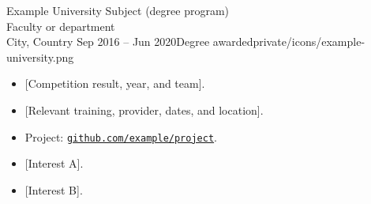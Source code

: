\begin{cvcontinued}{Example University}
  {Subject (degree program)\\Faculty or department\\City, Country}
  {Sep 2016 -- Jun 2020}{Degree awarded}{private/icons/example-university.png}
\end{cvcontinued}

\begin{itemize}
  \item {[Competition result, year, and team]}.
  \item {[Relevant training, provider, dates, and location]}.
  \item Project: \href{https://github.com/example/project}{\nolinkurl{github.com/example/project}}.
\end{itemize}

\begin{itemize}
  \item {[Interest A]}.
  \item {[Interest B]}.
\end{itemize}
